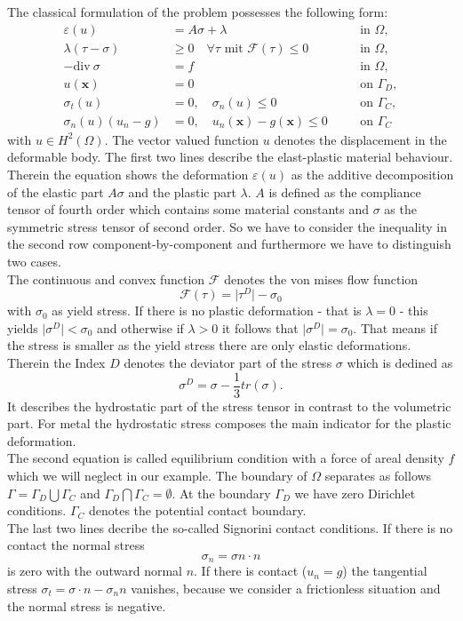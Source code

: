\documentclass{article}
\begin{document}
The classical formulation of the problem possesses the following form:
\begin{align*}
 \varepsilon(u) &= A\sigma + \lambda & &\quad\text{in } \Omega,\\
 \lambda(\tau - \sigma) &\geq 0\quad\forall\tau\text{ mit }\mathcal{F}(\tau)\leq 0 & &\quad\text{in } \Omega,\\
 -\textrm{div}\ \sigma &= f & &\quad\text{in } \Omega,\\
 u(\mathbf x) &= 0 & &\quad\text{on }\Gamma_D,\\
 \sigma_t(u) &= 0,\quad\sigma_n(u)\leq 0 & &\quad\text{on }\Gamma_C,\\
\sigma_n(u)(u_n - g) &= 0,\quad u_n(\mathbf x) - g(\mathbf x) \leq 0 & &\quad\text{on } \Gamma_C
\end{align*}
with $u\in H^2(\Omega)$.  The vector valued function $u$ denotes the
displacement in the deformable body. The first two lines describe the elast-plastic
material behaviour. Therein the equation shows the deformation $\varepsilon (u)$ as the additive
decomposition of the elastic part $A\sigma$ and the plastic part $\lambda$. $A$ is defined as
the compliance tensor of fourth order which contains some material constants and $\sigma$ as the
symmetric stress tensor of second order. So we have to consider the inequality in the second
row component-by-component and furthermore we have to distinguish two cases.\\
The continuous and convex function $\mathcal{F}$ denotes the von mises flow function
$$\mathcal{F}(\tau) = \vert\tau^D\vert - \sigma_0$$
with $\sigma_0$ as yield stress. If there is no plastic deformation - that is $\lambda=0$ - this yields $\vert\sigma^D\vert < \sigma_0$
and otherwise if $\lambda > 0$ it follows that $\vert\sigma^D\vert = \sigma_0$. That means if the stress is smaller as the yield stress
there are only elastic deformations. Therein the Index $D$ denotes the deviator part of the stress $\sigma$ which
is dedined as
$$\sigma^D = \sigma - \dfrac{1}{3}tr(\sigma).$$
It describes the hydrostatic part of the stress tensor in contrast to the volumetric part. For metal the hydrostatic
stress composes the main indicator for the plastic deformation.\\
The second equation is called equilibrium condition with a force of areal density $f$ which we will neglect in our example.
The boundary of $\Omega$ separates as follows $\Gamma=\Gamma_D\bigcup\Gamma_C$ and $\Gamma_D\bigcap\Gamma_C=\emptyset$.
At the boundary $\Gamma_D$ we have zero Dirichlet conditions. $\Gamma_C$ denotes the potential contact boundary.\\
The last two lines decribe the so-called Signorini contact conditions. If there is no contact the normal  stress
$$ \sigma_n =  \sigma n\cdot n$$
is zero with the outward normal $n$. If there is contact ($u_n = g$) the tangential stress $\sigma_t = \sigma\cdot n - \sigma_n n$
vanishes, because we consider a frictionless situation and the normal stress is negative.
\end{document}
